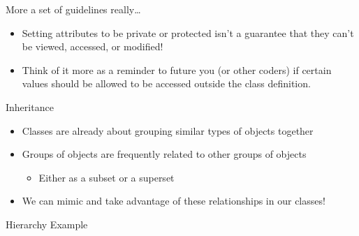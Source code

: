 \documentclass[pdf, aspectratio=169, 12pt]{beamer}
\begin{document}
\begin{frame}{More a set of guidelines really\ldots}
	\begin{itemize}
		\item Setting attributes to be private or protected isn't a guarantee that they can't be viewed, accessed, or modified!
		\item Think of it more as a reminder to future you (or other coders) if certain values should be allowed to be accessed outside the class definition.
	\end{itemize}
\end{frame}

\begin{frame}{Inheritance}
	\begin{itemize}
		\item Classes are already about grouping similar types of objects together
		\item Groups of objects are frequently related to other groups of objects
			\begin{itemize}
				\item Either as a subset or a superset
			\end{itemize}
		\item We can mimic and take advantage of these relationships in our classes!
	\end{itemize}
\end{frame}

\begin{frame}{Hierarchy Example}
	\vspace{5mm}
	\begin{center}
	\end{center}
\end{frame}
\end{document}
